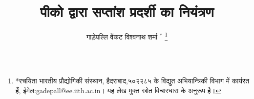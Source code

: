 \documentclass[journal,12pt,twocolumn]{IEEEtran}
\renewcommand\thesection{\arabic{section}}
\begin{document}
\let\StandardTheFigure\thefigure
\let\vec\mathbf
\renewcommand{\thefigure}{\thesection}



\def\putbox#1#2#3{\makebox[0in][l]{\makebox[#1][l]{}\raisebox{\baselineskip}[0in][0in]{\raisebox{#2}[0in][0in]{#3}}}}
     \def\rightbox#1{\makebox[0in][r]{#1}}
     \def\centbox#1{\makebox[0in]{#1}}
     \def\topbox#1{\raisebox{-\baselineskip}[0in][0in]{#1}}
     \def\midbox#1{\raisebox{-0.5\baselineskip}[0in][0in]{#1}}

\vspace{3cm}

\title{
 पीको  द्वारा सप्तांश प्रदर्शी का नियंत्रण
}
\author{ गाड़ेपल्लि वेंकट विश्वनाथ शर्मा $^{*}$%
	\thanks{*रचयिता भारतीय प्रौद्योगिकी संस्थान, हैदराबाद,५०२२८५ के विद्युत अभियान्त्रिकी विभाग में कार्यरत हैं, ईमेल:gadepall@ee.iith.ac.in। यह लेख मुक्त स्रोत विचारधारा के अनुरूप  है।}
	
}	


%
%
%

% 
%
\end{document}

